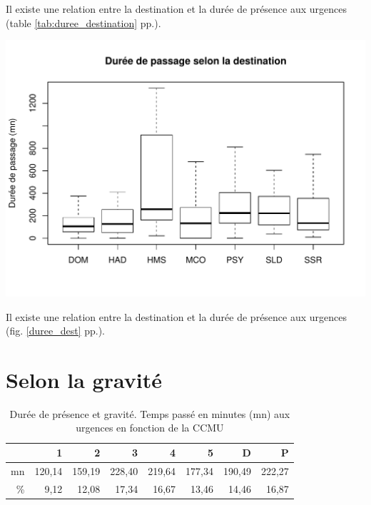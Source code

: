 \documentclass[12pt,english,french,twoside]{book}\usepackage[]{graphicx}\usepackage[]{color}
\makeatletter
\def\maxwidth{ %
  \ifdim\Gin@nat@width>\linewidth
    \linewidth
  \else
    \Gin@nat@width
  \fi
}
\newenvironment{knitrout}{}{} %
\makeatother
\begin{document}
Il existe une relation entre la destination et la durée de présence aux urgences (table \ref{tab:duree_destination} pp.\pageref{tab:duree_destination}).

\begin{center}
\begin{knitrout}
\color{fgcolor}
\includegraphics[width=\maxwidth]{figure/bp_duree_dest-1} 

\end{knitrout}
 \label{duree_dest}
\end{center}
Il existe une relation entre la destination et la durée de présence aux urgences (fig. \ref{duree_dest} pp.\pageref{duree_dest}).


\section{Selon la gravité}

\begin{table}[ht]
\centering
\begin{tabular}{rrrrrrrr}
  \hline
 & 1 & 2 & 3 & 4 & 5 & D & P \\ 
  \hline
mn & 120,14 & 159,19 & 228,40 & 219,64 & 177,34 & 190,49 & 222,27 \\ 
  \% & 9,12 & 12,08 & 17,34 & 16,67 & 13,46 & 14,46 & 16,87 \\ 
   \hline
\end{tabular}
\caption[Durée de présence et gravité]{Durée de présence et gravité. Temps passé en minutes (mn) aux urgences en fonction de la CCMU} 
\label{duree_gravite}
\end{table}
\end{document}
